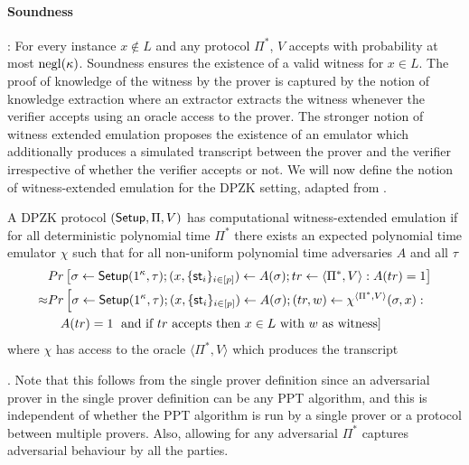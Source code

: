 \paragraph{Soundness}:  For every instance $x \notin L$ and any protocol $\Pi^*$, $V$ accepts with probability at most $\mathrm{negl}({\kappa})$.
Soundness ensures the existence of a valid witness for $x \in L$. The proof of knowledge of the witness by the prover is captured by the notion of knowledge extraction where an extractor extracts the witness whenever the verifier accepts using an oracle access to the prover. The stronger notion of witness extended emulation \cite{Lindell03} proposes the existence of an emulator which additionally produces a simulated transcript between the prover and the verifier irrespective of whether the verifier accepts or not. We will now define the notion of witness-extended emulation for the DPZK setting, adapted from \cite{Groth11}. 
\begin{definition}
A DPZK protocol $(\mathsf{Setup}, \Pi, V)$ has computational witness-extended emulation if for all deterministic polynomial time $\Pi^*$ there exists  an expected polynomial time emulator $\chi$ such that for all non-uniform polynomial time adversaries $A$ and all $\tau$
\begin{align*}
&Pr \left[\sigma \leftarrow \mathsf{Setup}(1^{\kappa}, \tau); (x, \{\mathsf{st}_i\}_{i \in [p]}) \leftarrow A(\sigma); tr \leftarrow \langle \Pi^*, V \rangle: A(tr) = 1 \right] \\
\approx &Pr \left[\sigma \leftarrow \mathsf{Setup}(1^{\kappa}, \tau); (x, \{\mathsf{st}_i\}_{i \in [p]}) \leftarrow A(\sigma); (tr, w) \leftarrow \chi^{\langle \Pi^*, V \rangle}(\sigma, x): \right. \\
&\,\,\,\,\,\, A(tr) = 1 \left. \text{ and if } tr \text{ accepts then } x \in L \text{ with } w \text{ as witness} \right] 
\end{align*}
where $\chi$ has access to the oracle $\langle \Pi^*, V \rangle$ which produces the transcript 
\end{definition}
.
Note that this follows from the single prover definition since an adversarial prover in the single prover definition can be any PPT algorithm, and this is independent of whether the PPT algorithm is run by a single prover or a protocol between multiple provers.
Also, allowing for any adversarial $\Pi^*$ captures adversarial behaviour by all the parties.

